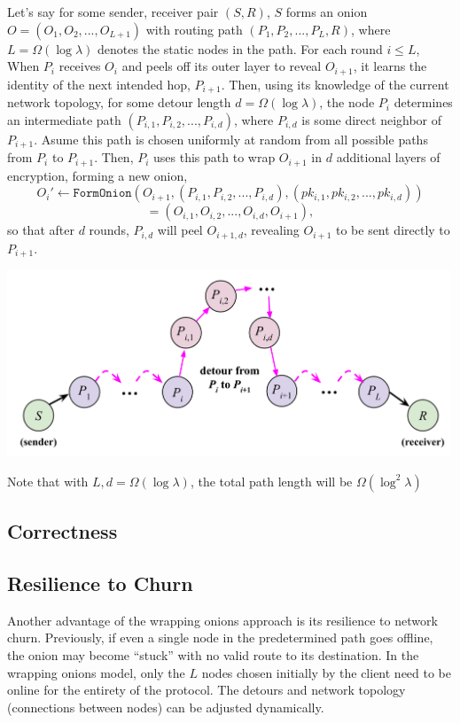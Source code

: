 Let's say for some sender, receiver pair $(S, R)$, $S$ forms an onion $O = (O_1, O_2,..., O_{L+1})$ with routing path $(P_1, P_2,...,P_L, R)$, where $L = \Omega(\log \lambda)$ denotes the static nodes in the path. For each round $i \leq L$, When $P_i$ receives $O_i$ and peels off its outer layer to reveal $O_{i+1}$, it learns the identity of the next intended hop, $P_{i+1}$. Then, using its knowledge of the current network topology, for some detour length $d = \Omega(\log \lambda)$, the node $P_i$ determines an intermediate path $(P_{i,1}, P_{i,2},..., P_{i,d})$, where $P_{i,d}$ is some direct neighbor of $P_{i+1}$. Asume this path is chosen uniformly at random from all possible paths from $P_i$ to $P_{i+1}$. Then, $P_i$ uses this path to wrap $O_{i+1}$ in $d$ additional layers of encryption, forming a new onion,
$$
O_i' \leftarrow \texttt{FormOnion}(O_{i+1}, (P_{i,1}, P_{i,2},..., P_{i,d}), (pk_{i,1}, pk_{i,2},..., pk_{i,d}))
$$ 
$$
= (O_{i,1}, O_{i,2}, ..., O_{i,d}, O_{i+1}),
$$
so that after $d$ rounds, $P_{i,d}$ will peel $O_{i+1,d}$, revealing $O_{i+1}$ to be sent directly to $P_{i+1}$. 

\begin{center}
    \includegraphics[width=375pt]{template/figures/detour.png}
\end{center}
Note that with $L, d = \Omega(\log \lambda)$, the total path length will be $\Omega(\log^2 \lambda)$

\subsection{Correctness}



\subsection{Resilience to Churn}

Another advantage of the wrapping onions approach is its resilience to network churn. Previously, if even a single node in the predetermined path goes offline, the onion may become ``stuck'' with no valid route to its destination. In the wrapping onions model, only the $L$ nodes chosen initially by the client need to be online for the entirety of the protocol. The detours and network topology (connections between nodes) can be adjusted dynamically. 

